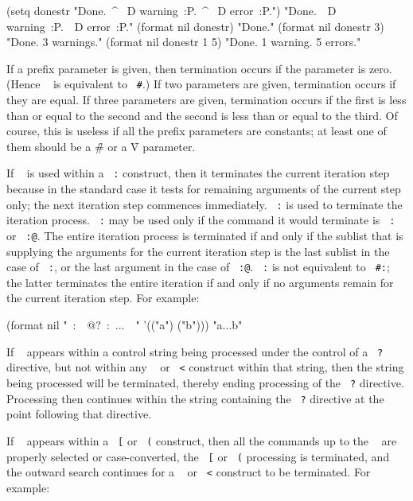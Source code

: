 \code
 (setq donestr "Done.~\^  ~D warning~:P.~\^  ~D error~:P.")
\EV "Done.~\hat ~D warning~:P.~\hat ~D error~:P."
 (format nil donestr) \EV "Done."
 (format nil donestr 3) \EV "Done. 3 warnings."
 (format nil donestr 1 5) \EV "Done. 1 warning. 5 errors."
\endcode
                                
If a prefix parameter is given, then termination occurs if the parameter
is zero.  (Hence {\tt ~\hat } is equivalent to 
{\tt ~\#\hat }.)  If two
parameters are given, termination occurs if they are equal.
  If three
parameters are given, termination occurs if the first is less than or
equal to the second and the second is less than or equal to the third.
Of course, this is useless if all the prefix parameters are constants; at
least one of them should be a \f{\#} or a \f{V} parameter.

If {\tt ~\hat } is used within a {\tt ~:\lbr  } 
construct, then it terminates
the current iteration step because in the standard case it tests for
remaining arguments of the current step only; the next iteration step
commences immediately.  {\tt ~:\hat } is used to terminate
the iteration process.
{\tt ~:\hat } 
may be used only if the command it would terminate is 
{\tt ~:\lbr  } or {\tt ~:@\lbr  }.
The entire iteration process is terminated if and only if the sublist that is
supplying the arguments for the current iteration step is the last sublist in
the case of {\tt ~:\lbr }, 
or the last         
argument in the case of {\tt ~:@\lbr  }. 
{\tt ~:\hat } is not
equivalent to {\tt ~#:\hat }; 
the latter terminates the entire iteration if and only if no
arguments remain for the current iteration step.
For example:

\code
 (format nil "~:\lbr\ ~@?~:\hat\ ...~\rbr\ " '(("a") ("b"))) \EV "a...b"
\endcode
{}

If {\tt ~\hat } appears within a control string being processed
under the control of a {\tt ~?} directive, but not within
any {\tt ~\lbr  } or {\tt ~<} construct within that string,
then the string being
processed will be terminated, thereby ending processing
of the {\tt ~?} directive.  Processing then
continues within the string   
containing the {\tt ~?} directive at the point following that directive.

If {\tt ~\hat }                                          
appears within a {\tt ~[} or {\tt ~(} construct,
then all the commands up to the {\tt ~\hat } are properly selected
or case-converted,                   
the {\tt ~[} or {\tt ~(} processing is terminated,
and the outward search continues         
for a {\tt ~\lbr  } or {\tt ~<} construct
to be terminated.  For example:
                            
